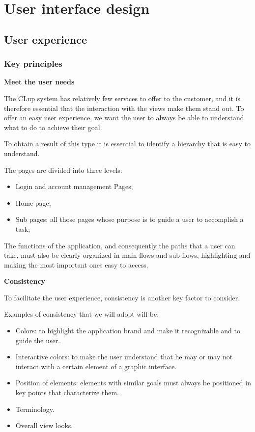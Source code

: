 \section{User interface design}
\label{sect:userinterfacedesign}

\subsection{User experience}
\label{subsect:userexperience}

\subsubsection{Key principles}
\label{subsubsect:keyprinciples}

\noindent
\textbf{Meet the user needs}

The CLup system has relatively few services to offer to the customer, and it is therefore essential that the interaction with the views make them stand out. To offer an easy user experience, we want the user to always be able to understand what to do to achieve their goal.

To obtain a result of this type it is essential to identify a hierarchy that is easy to understand.

\noindent
The pages are divided into three levels:
\begin{itemize}[topsep=0pt]
    \item Login and account management Pages;
    \item Home page;
    \item Sub pages: all those pages whose purpose is to guide a user to accomplish a task;
\end{itemize}

The functions of the application, and consequently the paths that a user can take, must also be clearly organized in main flows and sub flows, highlighting and making the most important ones easy to access.

\noindent
\textbf{Consistency}

To facilitate the user experience, consistency is another key factor to consider.

\noindent
Examples of consistency that we will adopt will be:
\begin{itemize}[topsep=0pt]
    \item Colors: to highlight the application brand and make it recognizable and to guide the user.
    \item Interactive colors: to make the user understand that he may or may not interact with a certain element of a graphic interface.
    \item Position of elements: elements with similar goals must always be positioned in key points that characterize them.
    \item Terminology.
    \item Overall view looks.
\end{itemize}

